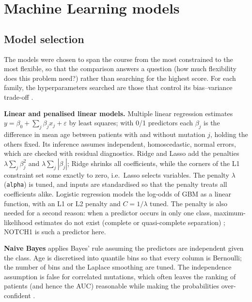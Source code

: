 \section{Machine Learning models}

\subsection{Model selection}

The models were chosen to span the course from the most constrained to the most flexible, so that
the comparison answers a question (how much flexibility does this problem need?) rather than
searching for the highest score. For each family, the hyperparameters searched are those that control
its bias--variance trade-off \cite{james2021,hastie2009}.

\textbf{Linear and penalised linear models.} Multiple linear regression estimates
$y = \beta_0 + \sum_j \beta_j x_j + \varepsilon$ by least squares; with 0/1 predictors each
$\beta_j$ is the difference in mean age between patients with and without mutation $j$, holding the
others fixed. Its inference assumes independent, homoscedastic, normal errors, which are checked with
residual diagnostics. Ridge \cite{hoerl1970} and Lasso \cite{tibshirani1996} add the penalties
$\lambda\sum_j\beta_j^2$ and $\lambda\sum_j|\beta_j|$; Ridge shrinks all coefficients, while the
corners of the L1 constraint set some exactly to zero, i.e.\ Lasso selects variables. The penalty
$\lambda$ (\texttt{alpha}) is tuned, and inputs are standardised so that the penalty treats all
coefficients alike. Logistic regression models the log-odds of GBM as a linear function, with an L1
or L2 penalty and $C = 1/\lambda$ tuned. The penalty is also needed for a second reason: when a
predictor occurs in only one class, maximum-likelihood estimates do not exist (complete or
quasi-complete separation) \cite{albert1984}; NOTCH1 is such a predictor here.

\textbf{Naive Bayes} applies Bayes' rule assuming the predictors are independent given the class.
Age is discretised into quantile bins so that every column is Bernoulli; the number of bins and the
Laplace smoothing are tuned. The independence assumption is false for correlated mutations, which
often leaves the ranking of patients (and hence the AUC) reasonable while making the probabilities
over-confident \cite{hand2001}.

